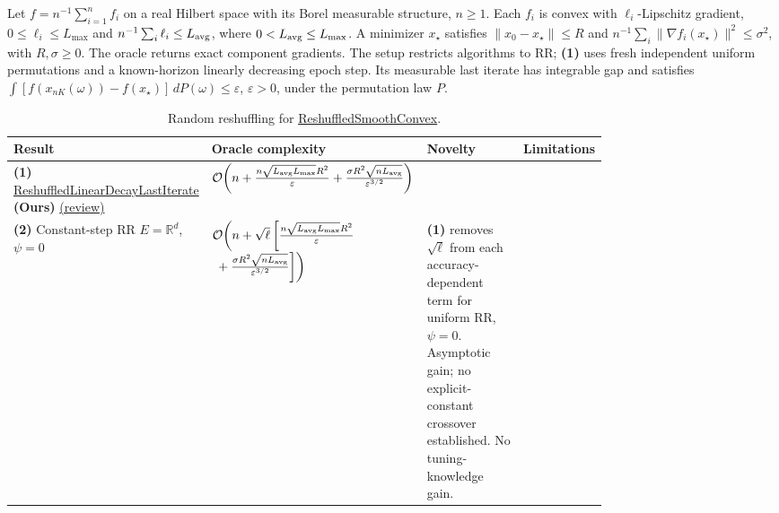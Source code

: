 \begin{table}[tp]
\centering
\caption{Random reshuffling for \href{https://github.com/k3nfalt/longtails/blob/main/LongTails/Setups/ReshuffledSmoothConvex.lean}{ReshuffledSmoothConvex}.}\label{tab:ReshuffledSmoothConvex}
\parbox{\linewidth}{\footnotesize Let $f=n^{-1}\sum_{i=1}^n f_i$ on a real Hilbert space with its Borel measurable structure, $n\ge1$. Each $f_i$ is convex with $\ell_i$-Lipschitz gradient, $0\le\ell_i\le L_{\max}$ and $n^{-1}\sum_i\ell_i\le L_{\rm avg}$, where $0<L_{\rm avg}\le L_{\max}$. A minimizer $x_\star$ satisfies $\|x_0-x_\star\|\le R$ and $n^{-1}\sum_i\|\nabla f_i(x_\star)\|^2\le\sigma^2$, with $R,\sigma\ge0$. The oracle returns exact component gradients. The setup restricts algorithms to RR; \textbf{(1)} uses fresh independent uniform permutations and a known-horizon linearly decreasing epoch step. Its measurable last iterate has integrable gap and satisfies $\int [f(x_{nK}(\omega))-f(x_\star)]\,dP(\omega)\le\varepsilon$, $\varepsilon>0$, under the permutation law $P$.}\par\smallskip
\begin{threeparttable}
\footnotesize
\setlength{\tabcolsep}{4pt}\renewcommand{\arraystretch}{1.25}
\begin{tabularx}{\linewidth}{@{}>{\raggedright\arraybackslash}p{0.20\linewidth}>{\raggedright\arraybackslash}p{0.32\linewidth}>{\raggedright\arraybackslash}p{0.25\linewidth}>{\raggedright\arraybackslash}X@{}}
\toprule
\textbf{Result} & \textbf{Oracle complexity} & \textbf{Novelty} & \textbf{Limitations} \\
\midrule
\textbf{(1)} \href{https://github.com/k3nfalt/longtails/blob/main/LongTails/Theorems/ReshuffledLinearDecayLastIterate.lean}{Reshuffled\allowbreak Linear\allowbreak Decay\allowbreak Last\allowbreak Iterate} \textbf{(Ours)} \href{https://github.com/k3nfalt/longtails/blob/main/scripts/reviews/ReshuffledLinearDecayLastIterate.md}{(review)}
& $\mathcal{O}\!\left(n+\frac{n\sqrt{L_{\rm avg}L_{\max}}R^2}{\varepsilon}+\frac{\sigma R^2\sqrt{nL_{\rm avg}}}{\varepsilon^{3/2}}\right)$ & & \\
\midrule[1.2pt]
\textbf{(2)} Constant-step RR \citep[Thm.~4.4 / C.1]{csrrLiuZhou2024v3}\newline $E=\mathbb{R}^d$, $\psi=0$
& $\mathcal{O}\!\left(n+\sqrt{\ell}\left[\frac{n\sqrt{L_{\rm avg}L_{\max}}R^2}{\varepsilon}\right.\right.$\newline $\left.\left.{}+\frac{\sigma R^2\sqrt{nL_{\rm avg}}}{\varepsilon^{3/2}}\right]\right)$
& \textbf{(1)} removes $\sqrt{\ell}$ from each accuracy-dependent term for uniform RR, $\psi=0$. Asymptotic gain; no explicit-constant crossover established. No tuning-knowledge gain.

\end{tabularx}
\end{threeparttable}
\end{table}
